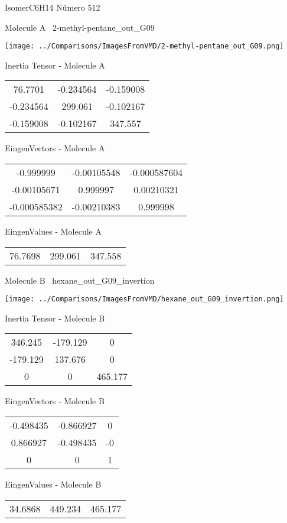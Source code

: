\vtab[-3cm]
\begin{center}
{\large IsomerC6H14 \tab Número 512}
\end{center}
\begin{multicols}{2}
\begin{center}

Molecule A \
2-methyl-pentane\_out\_G09

\texttt{[image: ../Comparisons/ImagesFromVMD/2-methyl-pentane\_out\_G09.png]}

Inertia Tensor - Molecule A \\
\begin{tabular}{|c c c|}
76.7701	 & 	-0.234564	 & 	-0.159008	 \\
-0.234564	 & 	299.061	 & 	-0.102167	 \\
-0.159008	 & 	-0.102167	 & 	347.557
\end{tabular}

\vtab
 EingenVectors - Molecule A     \\
\begin{tabular}{|c c c|}
-0.999999	 & 	-0.00105548	 & 	-0.000587604	 \\
-0.00105671	 & 	0.999997	 & 	0.00210321	 \\
-0.000585382	 & 	-0.00210383	 & 	0.999998
\end{tabular}

\vtab
 EingenValues - Molecule A     \\
\begin{tabular}{|c c c|}
76.7698	 & 	299.061	 & 	347.558	 \\
\end{tabular}
\columnbreak

Molecule B \
hexane\_out\_G09\_invertion

\texttt{[image: ../Comparisons/ImagesFromVMD/hexane\_out\_G09\_invertion.png]}

Inertia Tensor - Molecule B \\
\begin{tabular}{|c c c|}
346.245	 & 	-179.129	 & 	0	 \\
-179.129	 & 	137.676	 & 	0	 \\
0	 & 	0	 & 	465.177
\end{tabular}

\vtab
 EingenVectors - Molecule B     \\
\begin{tabular}{|c c c|}
-0.498435	 & 	-0.866927	 & 	0	 \\
0.866927	 & 	-0.498435	 & 	-0	 \\
0	 & 	0	 & 	1
\end{tabular}

\vtab
 EingenValues - Molecule B     \\
\begin{tabular}{|c c c|}
34.6868	 & 	449.234	 & 	465.177	 \\
\end{tabular}

\end{center}
\end{multicols}


